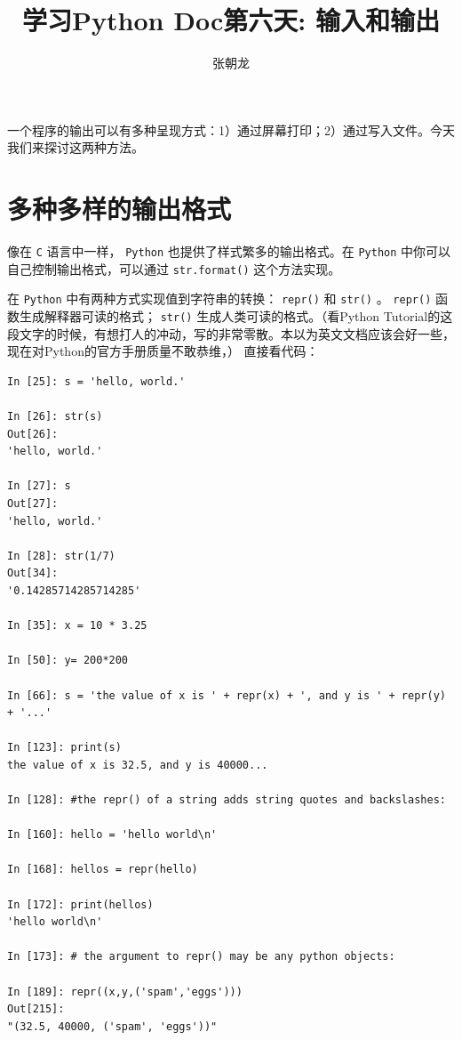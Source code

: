 \documentclass[10pt,a4paper,UTF8]{article}
\author{张朝龙}
\date{}
\title{学习Python Doc第六天: 输入和输出}
\begin{document}
\maketitle
\tableofcontents
{}
一个程序的输出可以有多种呈现方式：1）通过屏幕打印；2）通过写入文件。今天我们来探讨这两种方法。

\section{多种多样的输出格式}
\label{sec:orgd236dd1}


像在 \texttt{C} 语言中一样， \texttt{Python} 也提供了样式繁多的输出格式。在 \texttt{Python} 中你可以自己控制输出格式，可以通过 \texttt{str.format()} 这个方法实现。

在 \texttt{Python} 中有两种方式实现值到字符串的转换：  \texttt{repr()} 和 \texttt{str()} 。 \texttt{repr()} 函数生成解释器可读的格式； \texttt{str()} 生成人类可读的格式。（看Python Tutorial的这段文字的时候，有想打人的冲动，写的非常零散。本以为英文文档应该会好一些，现在对Python的官方手册质量不敢恭维，） 直接看代码：

\lstset{language=Python,label= ,caption= ,captionpos=b,numbers=none}
\begin{lstlisting}
In [25]: s = 'hello, world.'

In [26]: str(s)
Out[26]: 
'hello, world.'

In [27]: s
Out[27]: 
'hello, world.'

In [28]: str(1/7)
Out[34]: 
'0.14285714285714285'

In [35]: x = 10 * 3.25

In [50]: y= 200*200

In [66]: s = 'the value of x is ' + repr(x) + ', and y is ' + repr(y) + '...'

In [123]: print(s)
the value of x is 32.5, and y is 40000...

In [128]: #the repr() of a string adds string quotes and backslashes:

In [160]: hello = 'hello world\n'

In [168]: hellos = repr(hello)

In [172]: print(hellos)
'hello world\n'

In [173]: # the argument to repr() may be any python objects:

In [189]: repr((x,y,('spam','eggs')))
Out[215]: 
"(32.5, 40000, ('spam', 'eggs'))"
\end{lstlisting}
\end{document}
